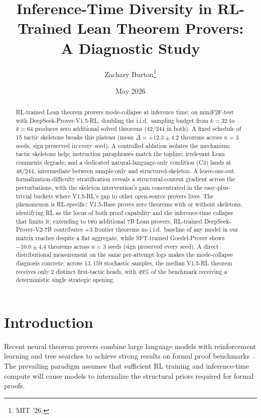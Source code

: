 \documentclass{article}
\title{Inference-Time Diversity in RL-Trained Lean Theorem Provers:\\A Diagnostic Study}
\author{Zachary Burton\thanks{MIT '26.}}
\date{May 2026}
\begin{document}
\maketitle

\begin{abstract}
RL-trained Lean theorem provers mode-collapse at inference time: on miniF2F-test with DeepSeek-Prover-V1.5-RL, doubling the i.i.d.\ sampling budget from $k{=}32$ to $k{=}64$ produces zero additional solved theorems (42/244 in both). A fixed schedule of 15 tactic skeletons breaks this plateau (mean $\Delta = +12.3 \pm 4.2$ theorems across $n{=}3$ seeds, sign preserved in every seed). A controlled ablation isolates the mechanism: tactic skeletons help; instruction paraphrases match the topline; irrelevant Lean comments degrade; and a dedicated natural-language-only condition (C3) lands at 48/244, intermediate between sample-only and structured-skeleton. A leave-one-out formalization-difficulty stratification reveals a structural-content gradient across the perturbations, with the skeleton intervention's gain concentrated in the easy-plus-trivial buckets where V1.5-RL's gap to other open-source provers lives. The phenomenon is RL-specific: V1.5-Base proves zero theorems with or without skeletons, identifying RL as the locus of both proof capability and the inference-time collapse that limits it; extending to two additional 7B Lean provers, RL-trained DeepSeek-Prover-V2-7B contributes $+3$ frontier theorems no i.i.d.\ baseline of any model in our matrix reaches despite a flat aggregate, while SFT-trained Goedel-Prover shows $-10.0 \pm 4.4$ theorems across $n{=}3$ seeds (sign preserved every seed). A direct distributional measurement on the same per-attempt logs makes the mode-collapse diagnosis concrete: across $13{,}159$ stochastic samples, the median V1.5-RL theorem receives only $2$ distinct first-tactic heads, with $49\%$ of the benchmark receiving a deterministic single strategic opening.
\end{abstract}

\section{Introduction}

Recent neural theorem provers combine large language models with reinforcement learning and tree searches to achieve strong results on formal proof benchmarks~\cite{xin2024deepseek, chen2025seed, trinh2024solving, lin2025goedel}. The prevailing paradigm assumes that sufficient RL training and inference-time compute will cause models to internalize the structural priors required for formal proofs.
\end{document}
